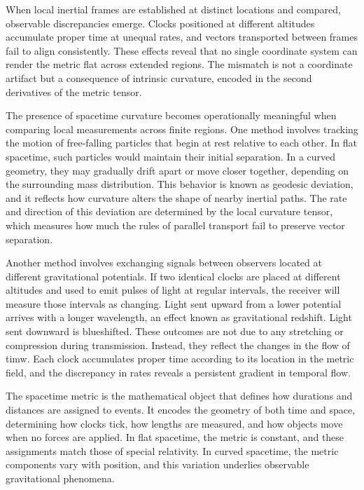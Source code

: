 When local inertial frames are established at distinct locations and compared, observable discrepancies emerge. Clocks positioned at different altitudes accumulate proper time at unequal rates, and vectors transported between frames fail to align consistently. These effects reveal that no single coordinate system can render the metric flat across extended regions. The mismatch is not a coordinate artifact but a consequence of intrinsic curvature, encoded in the second derivatives of the metric tensor.

The presence of spacetime curvature becomes operationally meaningful when comparing local measurements across finite regions. One method involves tracking the motion of free-falling particles that begin at rest relative to each other. In flat spacetime, such particles would maintain their initial separation. In a curved geometry, they may gradually drift apart or move closer together, depending on the surrounding mass distribution. This behavior is known as geodesic deviation, and it reflects how curvature alters the shape of nearby inertial paths. The rate and direction of this deviation are determined by the local curvature tensor, which measures how much the rules of parallel transport fail to preserve vector separation.

Another method involves exchanging signals between observers located at different gravitational potentials. If two identical clocks are placed at different altitudes and used to emit pulses of light at regular intervals, the receiver will measure those intervals as changing. Light sent upward from a lower potential arrives with a longer wavelength, an effect known as gravitational redshift. Light sent downward is blueshifted. These outcomes are not due to any stretching or compression during transmission. Instead, they reflect the changes in the flow of timw. Each clock accumulates proper time according to its location in the metric field, and the discrepancy in rates reveals a persistent gradient in temporal flow.

The spacetime metric is the mathematical object that defines how durations and distances are assigned to events. It encodes the geometry of both time and space, determining how clocks tick, how lengths are measured, and how objects move when no forces are applied. In flat spacetime, the metric is constant, and these assignments match those of special relativity. In curved spacetime, the metric components vary with position, and this variation underlies observable gravitational phenomena.

